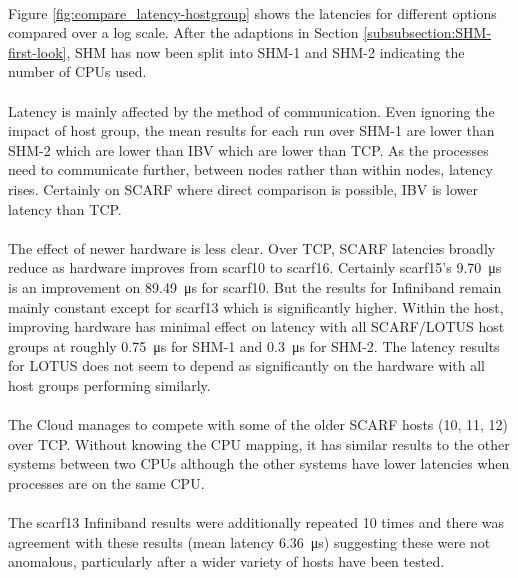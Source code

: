 \documentclass{article}
\begin{document}
            \paragraph{} Figure \ref{fig:compare_latency-hostgroup} shows the latencies for different options compared over a log scale. After the adaptions in Section \ref{subsubsection:SHM-first-look}, SHM has now been split into SHM-1 and SHM-2 indicating the number of CPUs used.

            \paragraph{}
            Latency is mainly affected by the method of communication. Even ignoring the impact of host group, the mean results for each run over SHM-1 are lower than SHM-2 which are lower than IBV which are lower than TCP. As the processes need to communicate further, between nodes rather than within nodes, latency rises. Certainly on SCARF where direct comparison is possible, IBV is lower latency than TCP.

            \paragraph{}
            The effect of newer hardware is less clear. Over TCP, SCARF latencies broadly reduce as hardware improves from scarf10 to scarf16. Certainly scarf15's \SI{9.70}{\micro\second} is an improvement on \SI{89.49}{\micro\second} for scarf10. But the results for Infiniband remain mainly constant except for scarf13 which is significantly higher. Within the host, improving hardware has minimal effect on latency with all SCARF/LOTUS host groups at roughly \SI{0.75}{\micro\second} for SHM-1 and \SI{0.3}{\micro\second} for SHM-2. The latency results for LOTUS does not seem to depend as significantly on the hardware with all host groups performing similarly.

            \paragraph{}
            The Cloud manages to compete with some of the older SCARF hosts (10, 11, 12) over TCP. Without knowing the CPU mapping, it has similar results to the other systems between two CPUs although the other systems have lower latencies when processes are on the same CPU.

            \paragraph{}
            The scarf13 Infiniband results were additionally repeated 10 times and there was agreement with these results (mean latency \SI{6.36}{\micro\second}) suggesting these were not anomalous, particularly after a wider variety of hosts have been tested.
\end{document}
